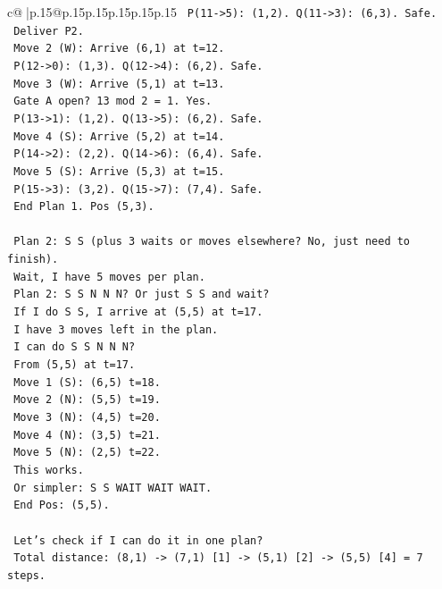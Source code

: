 \documentclass{article}
\begin{document}
{\begin{supertabular}{c@{$\;$}|p{.15\linewidth}@{}p{.15\linewidth}p{.15\linewidth}p{.15\linewidth}p{.15\linewidth}p{.15\linewidth}}
{{{\texttt{     P(11{-}>5): (1,2). Q(11{-}>3): (6,3). Safe.} \\
\texttt{     Deliver P2.} \\
\texttt{   Move 2 (W): Arrive (6,1) at t=12.} \\
\texttt{     P(12{-}>0): (1,3). Q(12{-}>4): (6,2). Safe.} \\
\texttt{   Move 3 (W): Arrive (5,1) at t=13.} \\
\texttt{     Gate A open? 13 mod 2 = 1. Yes.} \\
\texttt{     P(13{-}>1): (1,2). Q(13{-}>5): (6,2). Safe.} \\
\texttt{   Move 4 (S): Arrive (5,2) at t=14.} \\
\texttt{     P(14{-}>2): (2,2). Q(14{-}>6): (6,4). Safe.} \\
\texttt{   Move 5 (S): Arrive (5,3) at t=15.} \\
\texttt{     P(15{-}>3): (3,2). Q(15{-}>7): (7,4). Safe.} \\
\texttt{   End Plan 1. Pos (5,3).} \\
\\ 
\texttt{   Plan 2: S S (plus 3 waits or moves elsewhere? No, just need to finish).} \\
\texttt{   Wait, I have 5 moves per plan.} \\
\texttt{   Plan 2: S S N N N? Or just S S and wait?} \\
\texttt{   If I do S S, I arrive at (5,5) at t=17.} \\
\texttt{   I have 3 moves left in the plan.} \\
\texttt{   I can do S S N N N?} \\
\texttt{   From (5,5) at t=17.} \\
\texttt{   Move 1 (S): (6,5) t=18.} \\
\texttt{   Move 2 (N): (5,5) t=19.} \\
\texttt{   Move 3 (N): (4,5) t=20.} \\
\texttt{   Move 4 (N): (3,5) t=21.} \\
\texttt{   Move 5 (N): (2,5) t=22.} \\
\texttt{   This works.} \\
\texttt{   Or simpler: S S WAIT WAIT WAIT.} \\
\texttt{   End Pos: (5,5).} \\
\\ 
\texttt{   Let's check if I can do it in one plan?} \\
\texttt{   Total distance: (8,1) {-}> (7,1) {[}1{]} {-}> (5,1) {[}2{]} {-}> (5,5) {[}4{]} = 7 steps.} \\
}}}
\end{supertabular}}
\end{document}
